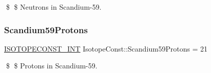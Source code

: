 \$ \$ Neutrons in Scandium-\/59. \mbox{\label{group___isotope_const-_scandium-_sc59_ga30a5b3be93fc45f862ef4019c2b5aca6}} 
\subsubsection{\texorpdfstring{Scandium59\+Protons}{Scandium59Protons}}
{\footnotesize\ttfamily \mbox{\hyperlink{group___isotope_const-_macros_ga5f18360b3e99483a35c32d789e62621c}{I\+S\+O\+T\+O\+P\+E\+C\+O\+N\+S\+T\+\_\+\+I\+NT}} Isotope\+Const\+::\+Scandium59\+Protons = 21}

\$ \$ Protons in Scandium-\/59. 